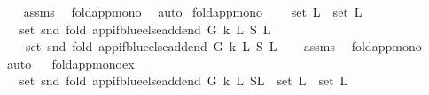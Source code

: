 \begin{isabellebody}
%
\isadelimproof
\ \ %
\endisadelimproof
%
\isatagproof
{}\isamarkupfalse%
\ assms\ \isamarkupfalse%
\ fold{\isacharunderscore}{\kern0pt}app{\isacharunderscore}{\kern0pt}mono\ \isamarkupfalse%
\ auto%
\endisatagproof
{\isafoldproof}%
%
\isadelimproof
\isanewline
%
\endisadelimproof
\isanewline
{}\isamarkupfalse%
\ fold{\isacharunderscore}{\kern0pt}app{\isacharunderscore}{\kern0pt}mono{}{\isacharcolon}{\kern0pt}\ \isanewline
\ \ \ {\isachardoublequoteopen}set\ L{}\ {\isasymsubseteq}\ set\ L{}{\isachardoublequoteclose}\isanewline
\ \ \ {\isachardoublequoteopen}set\ {\isacharparenleft}{\kern0pt}snd\ {\isacharparenleft}{\kern0pt}fold\ {\isacharparenleft}{\kern0pt}app{\isacharunderscore}{\kern0pt}if{\isacharunderscore}{\kern0pt}blue{\isacharunderscore}{\kern0pt}else{\isacharunderscore}{\kern0pt}add{\isacharunderscore}{\kern0pt}end\ G\ k{\isacharparenright}{\kern0pt}\ L\ {\isacharparenleft}{\kern0pt}S{}{\isacharcomma}{\kern0pt}\ L{}{\isacharparenright}{\kern0pt}{\isacharparenright}{\kern0pt}{\isacharparenright}{\kern0pt}\isanewline
\ \ \ {\isasymsubseteq}\ set\ {\isacharparenleft}{\kern0pt}snd\ {\isacharparenleft}{\kern0pt}fold\ {\isacharparenleft}{\kern0pt}app{\isacharunderscore}{\kern0pt}if{\isacharunderscore}{\kern0pt}blue{\isacharunderscore}{\kern0pt}else{\isacharunderscore}{\kern0pt}add{\isacharunderscore}{\kern0pt}end\ G\ k{\isacharparenright}{\kern0pt}\ L\ {\isacharparenleft}{\kern0pt}S{}{\isacharcomma}{\kern0pt}\ L{}{\isacharparenright}{\kern0pt}{\isacharparenright}{\kern0pt}{\isacharparenright}{\kern0pt}{\isachardoublequoteclose}\isanewline
%
\isadelimproof
\ \ %
\endisadelimproof
%
\isatagproof
{}\isamarkupfalse%
\ assms\ \isamarkupfalse%
\ fold{\isacharunderscore}{\kern0pt}app{\isacharunderscore}{\kern0pt}mono\isanewline
\ \ \isamarkupfalse%
\ auto%
\endisatagproof
{\isafoldproof}%
%
\isadelimproof
\ \isanewline
%
\endisadelimproof
\isanewline
\isanewline
{}\isamarkupfalse%
\ fold{\isacharunderscore}{\kern0pt}app{\isacharunderscore}{\kern0pt}mono{\isacharunderscore}{\kern0pt}ex{\isacharcolon}{\kern0pt}\ \isanewline
\ \ \ {\isachardoublequoteopen}set\ {\isacharparenleft}{\kern0pt}snd\ {\isacharparenleft}{\kern0pt}fold\ {\isacharparenleft}{\kern0pt}app{\isacharunderscore}{\kern0pt}if{\isacharunderscore}{\kern0pt}blue{\isacharunderscore}{\kern0pt}else{\isacharunderscore}{\kern0pt}add{\isacharunderscore}{\kern0pt}end\ G\ k{\isacharparenright}{\kern0pt}\ L{}\ {\isacharparenleft}{\kern0pt}S{\isacharcomma}{\kern0pt}L{}{\isacharparenright}{\kern0pt}{\isacharparenright}{\kern0pt}{\isacharparenright}{\kern0pt}\ {\isacharequal}{\kern0pt}\ {\isacharparenleft}{\kern0pt}set\ L{}\ {\isasymunion}\ set\ L{}{\isacharparenright}{\kern0pt}{\isachardoublequoteclose}\ \isanewline

\end{isabellebody}

